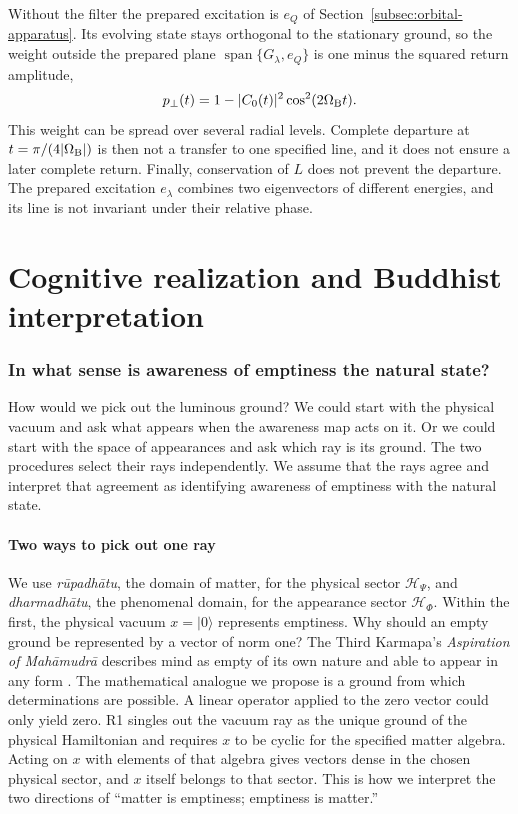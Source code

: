 \documentclass[11pt]{article}
\theoremstyle{definition}
\DeclareMathOperator{\Span}{span}
\newcommand{\ket}[1]{\lvert #1\rangle}
\begin{document}
Without the filter the prepared excitation is $e_Q$ of Section~\ref{subsec:orbital-apparatus}. Its evolving state stays orthogonal to the stationary ground, so the weight outside the prepared plane $\Span\{G_\lambda,e_Q\}$ is one minus the squared return amplitude,
\begin{equation}
 p_\perp(t)=1-|C_0(t)|^2\cos^2(2\Omega_{\rm B}t).
 \label{eq:pair-currents-unfiltered}
\end{equation}
This weight can be spread over several radial levels. Complete departure at $t=\pi/(4|\Omega_{\rm B}|)$ is then not a transfer to one specified line, and it does not ensure a later complete return. Finally, conservation of $L$ does not prevent the departure. The prepared excitation $e_\lambda$ combines two eigenvectors of different energies, and its line is not invariant under their relative phase.

\part*{Cognitive realization and Buddhist interpretation}

\section{In what sense is awareness of emptiness the natural state?}
\label{sec:cognitive-ground}

How would we pick out the luminous ground? We could start with the physical vacuum and ask what appears when the awareness map acts on it. Or we could start with the space of appearances and ask which ray is its ground. The two procedures select their rays independently. We assume that the rays agree and interpret that agreement as identifying awareness of emptiness with the natural state.

\subsection{Two ways to pick out one ray}
\label{subsec:cognitive-ground-selection}

We use \emph{r\=upadh\=atu}, the domain of matter, for the physical sector $\mathcal H_\Psi$, and \emph{dharmadh\=atu}, the phenomenal domain, for the appearance sector $\mathcal H_\Phi$. Within the first, the physical vacuum $x=\ket{0}$ represents emptiness. Why should an empty ground be represented by a vector of norm one? The Third Karmapa's \emph{Aspiration of Mah\=amudr\=a} describes mind as empty of its own nature and able to appear in any form \cite[epigraph preceding the Introduction]{Yiannopoulos2020}. The mathematical analogue we propose is a ground from which determinations are possible. A linear operator applied to the zero vector could only yield zero. R1 singles out the vacuum ray as the unique ground of the physical Hamiltonian and requires $x$ to be cyclic for the specified matter algebra. Acting on $x$ with elements of that algebra gives vectors dense in the chosen physical sector, and $x$ itself belongs to that sector. This is how we interpret the two directions of ``matter is emptiness; emptiness is matter.''
\end{document}
